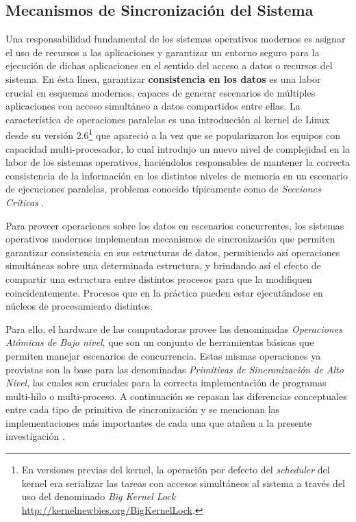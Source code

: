 \subsection{Mecanismos de Sincronización del Sistema}
Una responsabilidad fundamental de los sistemas operativos modernos es asignar el uso de recursos a las aplicaciones y garantizar un entorno seguro para la ejecución de dichas aplicaciones en el sentido del acceso a datos o recursos del sistema. En ésta línea, garantizar \textbf{consistencia en los datos} es una labor crucial en esquemas modernos, capaces de generar escenarios de múltiples aplicaciones con acceso simultáneo a datos compartidos entre ellas. La característica de operaciones paralelas es una introducción al kernel de Linux desde su versión 2.6\footnote{En versiones previas del kernel, la operación por defecto del \emph{scheduler} del kernel era serializar las tareas con accesos simultáneos al sistema a través del uso del denominado \emph{Big Kernel Lock} \url{http://kernelnewbies.org/BigKernelLock}.} que apareció a la vez que se popularizaron los equipos con capacidad multi-procesador, lo cual introdujo un nuevo nivel de complejidad en la labor de los sistemas operativos, haciéndolos responsables de mantener la correcta consistencia de la información en los distintos niveles de memoria en un escenario de ejecuciones paralelas, problema conocido típicamente como de \emph{Secciones Críticas} \cite{paper:cachebouncing, paper:nonscalablelocks}.

Para proveer operaciones sobre los datos en escenarios concurrentes, los sistemas operativos modernos implementan mecanismos de sincronización que permiten garantizar consistencia en sus estructuras de datos, permitiendo así operaciones simultáneas sobre una determinada estructura, y brindando así el efecto de compartir una estructura entre distintos procesos para que la modifiquen coincidentemente. Procesos que en la práctica pueden estar ejecutándose en núcleos de procesamiento distintos.

Para ello, el hardware de las computadoras provee las denominadas \emph{Operaciones Atómicas de Bajo nivel}, que son un conjunto de herramientas básicas que permiten manejar escenarios de concurrencia. Estas mismas operaciones ya provistas son la base para las denominadas \emph{Primitivas de Sincronización de Alto Nivel}, las cuales son cruciales para la correcta implementación de programas multi-hilo o multi-proceso. A continuación se repasan las diferencias conceptuales entre cada tipo de primitiva de sincronización y se mencionan las implementaciones más importantes de cada una que atañen a la presente investigación \cite{book:SOConcepts}.

